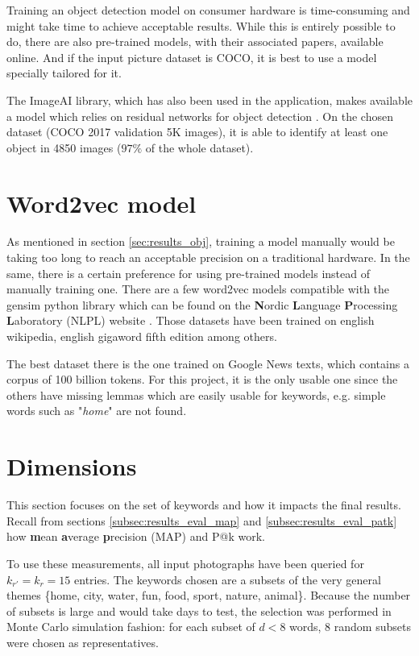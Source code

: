 Training an object detection model on consumer hardware is time-consuming and might take time to achieve acceptable results. While this is entirely possible to do, there are also pre-trained models, with their associated papers, available online. And if the input picture dataset is COCO, it is best to use a model specially tailored for it. 

The ImageAI library, which has also been used in the application, makes available a model which relies on residual networks for object detection \cite{image-ai}. On the chosen dataset (COCO 2017 validation 5K images), it is able to identify at least one object in 4850 images ($97\%$ of the whole dataset).

\section{Word2vec model}
\label{sec:results_word2vec}

As mentioned in section \ref{sec:results_obj}, training a model manually would be taking too long to reach an acceptable precision on a traditional hardware. In the same, there is a certain preference for using pre-trained models instead of manually training one. There are a few word2vec models compatible with the gensim python library which can be found on the \textbf{N}ordic \textbf{L}anguage \textbf{P}rocessing \textbf{L}aboratory (NLPL) website \cite{word2vec-datasets}. Those datasets have been trained on english wikipedia, english gigaword fifth edition among others.

The best dataset there is the one trained on Google News texts, which contains a corpus of 100 billion tokens. For this project, it is the only usable one since the others have missing lemmas which are easily usable for keywords, e.g. simple words such as "\textit{home}" are not found.

\section{Dimensions}
\label{sec:results_dimensions}

This section focuses on the set of keywords and how it impacts the final results. Recall from sections \ref{subsec:results_eval_map} and \ref{subsec:results_eval_patk} how \textbf{m}ean \textbf{a}verage \textbf{p}recision (MAP) and P@k work. 

To use these measurements, all input photographs have been queried for $k_{r'}= k_r =15$ entries. The keywords chosen are a subsets of the very general themes \{home, city, water, fun, food, sport, nature, animal\}. Because the number of subsets is large and would take days to test, the selection was performed in Monte Carlo simulation fashion: for each subset of $d < 8$ words, 8 random subsets were chosen as representatives.


